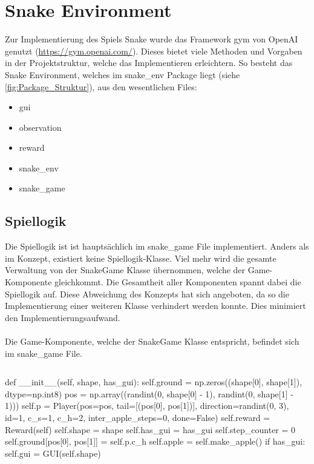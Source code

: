 \section{Snake Environment}
Zur Implementierung des Spiels Snake wurde das Framework gym von OpenAI genutzt (\url{https://gym.openai.com/}). Dieses bietet viele Methoden und Vorgaben in der Projektstruktur, welche das Implementieren erleichtern. So besteht das Snake Environment, welches im snake\_env Package liegt (siehe \ref{fig:Package_Struktur}), aus den wesentlichen Files:
\begin{itemize}
	\item gui
	\item observation
	\item reward
	\item snake\_env
	\item snake\_game
\end{itemize}

\subsection{Spiellogik} \label{sec:Implementierung-Spiellogik}
Die Spiellogik ist ist hauptsächlich im snake\_game File implementiert. Anders als im Konzept, existiert keine Spiellogik-Klasse. Viel mehr wird die gesamte Verwaltung von der SnakeGame Klasse übernommen, welche der Game-Komponente gleichkommt. Die Gesamtheit aller Komponenten spannt dabei die Spiellogik auf. Diese Abweichung des Konzepts hat sich angeboten, da so die Implementierung einer weiteren Klasse verhindert werden konnte. Dies minimiert den Implementierungsaufwand.\\
\\Die Game-Komponente, welche der SnakeGame Klasse entspricht, befindet sich im snake\_game File.
\begin{lstlisting}[label=alg:SnakeGame_Konstruktor]
\end{lstlisting}
\begin{python} 
	def __init__(self, shape, has_gui):
		self.ground = np.zeros((shape[0], shape[1]), dtype=np.int8)
		pos = np.array((randint(0, shape[0] - 1), randint(0, shape[1] - 1)))
		self.p = Player(pos=pos, tail=[(pos[0], pos[1])], direction=randint(0, 3), id=1, c_s=1, c_h=2,
		inter_apple_steps=0, done=False)
		self.reward = Reward(self)
		self.shape = shape
		self.has_gui = has_gui
		self.step_counter = 0
		self.ground[pos[0], pos[1]] = self.p.c_h
		self.apple = self.make_apple()
		if has_gui:
		self.gui = GUI(self.shape)
\end{python}

